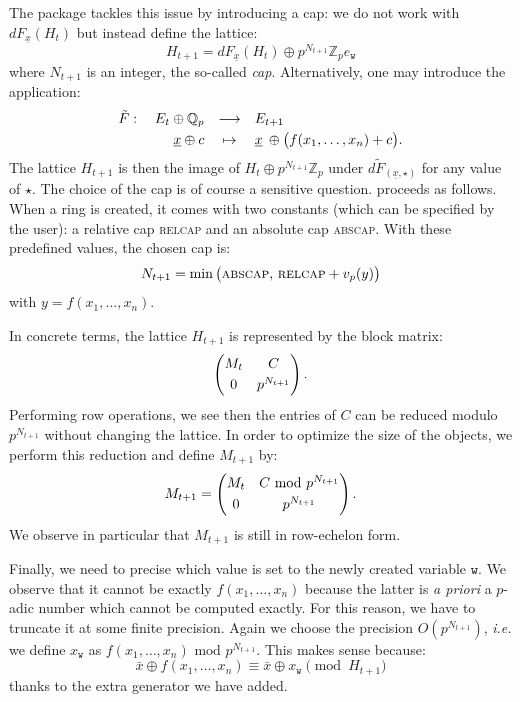 \documentclass[sigconf]{acmart}
\newcommand{\Z}{\mathbb Z}
\newcommand{\Zp}{\Z_p}
\newcommand{\Q}{\mathbb Q}
\newcommand{\Qp}{\Q_p}
\newcommand{\ttw}{\texttt{w}\xspace}
\newcommand{\ZpLC}{\text{\rm \tt ZpLC}\xspace}
\theoremstyle{definition}
\begin{document}
The package \ZpLC tackles this issue by introducing a cap: we do not 
work with $dF_{\underline x}(H_t)$ but instead define the lattice: 
$$H_{t+1} = dF_{\underline x}(H_t) \oplus p^{N_{t+1}} \Zp e_\ttw$$
where $N_{t+1}$ is an integer, the so-called \emph{cap}.
Alternatively, one may introduce the application:
\begin{equation}
\label{eq:tildeF}
\begin{array}{rcl}
\tilde F: \quad E_t \oplus \Qp & \longrightarrow & E_{t+1} \smallskip \\
\underline x \oplus c & \mapsto & \underline x \:\oplus 
\big(f(x_1, \ldots, x_n) + c\big).
\end{array}
\end{equation}
The lattice $H_{t+1}$ is then the image of $H_t \oplus p^{N_{t+1}}
\Zp$ under $d\tilde F_{(\underline x, \star)}$ for any value of $\star$.
The choice of the 
cap is of course a sensitive question. \ZpLC proceeds as follows. When a 
ring is created, it comes with two constants (which can be specified by 
the user): a relative cap \textsc{relcap} and an absolute cap 
\textsc{abscap}. With these predefined values, the chosen cap is:
\begin{equation}
\label{eq:cap}
N_{t+1} = 
\min\big(\textsc{abscap},\, \textsc{relcap} + v_p(y)\big)
\end{equation}
with $y = f(x_1, \ldots, x_n)$.

In concrete terms, the lattice $H_{t+1}$ is represented by the block 
matrix:
$$\left(\begin{matrix}
M_t & C \smallskip \\ 0 & p^{N_{t+1}}
\end{matrix}\right).$$
Performing row operations, we see then the entries of $C$ can be
reduced modulo $p^{N_{t+1}}$ without changing the lattice. In order
to optimize the size of the objects, we perform this reduction and
define $M_{t+1}$ by:
$$M_{t+1} = \left(\begin{matrix}
M_t & C \text{ mod } p^{N_{t+1}} \smallskip \\ 0 & p^{N_{t+1}}
\end{matrix}\right).$$
We observe in particular that $M_{t+1}$ is still in row-echelon form.

Finally, we need to precise which value is set to the newly created 
variable $\ttw$. We observe that it cannot be exactly $f(x_1, \ldots, 
x_n)$ because the latter is \emph{a priori} a $p$-adic number which 
cannot be computed exactly. For this reason, we have to truncate it at 
some finite precision. Again we choose the precision $O(p^{N_{t+1}})$,
\emph{i.e.} we define $x_\ttw$ as $f(x_1, \ldots, x_n) \text{ mod } 
p^{N_{t+1}}$. This makes sense because:
$$\bar x \oplus f(x_1, \ldots, x_n) \equiv
\bar x \oplus x_\ttw \pmod{H_{t+1}}$$
thanks to the extra generator we have added.
\end{document}
